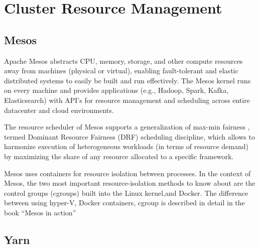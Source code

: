 \section{Cluster Resource Management}
\label{S:o-cluster}


\subsection{Mesos}

     Apache Mesos \cite{www-mesos} abstracts CPU, memory,
     storage, and other compute resources away from machines (physical
     or virtual), enabling fault-tolerant and elastic distributed
     systems to easily be built and run effectively. The Mesos kernel
     runs on every machine and provides applications (e.g., Hadoop,
     Spark, Kafka, Elasticsearch) with API’s for resource management
     and scheduling across entire datacenter and cloud environments.

     The resource scheduler of Mesos supports a generalization of
     max-min fairness \cite{paper-mesos-Abu-Dbai-2016}, termed Dominant
     Resource Fairness (DRF) \cite{paper-mesos-ghodsi2011dominant}
     scheduling discipline, which allows to harmonize execution of
     heterogeneous workloads (in terms of resource demand) by
     maximizing the share of any resource allocated to a specific
     framework.
     
     Mesos uses containers for resource isolation between
     processes. In the context of Mesos, the two most important
     resource-isolation methods to know about are the control groups
     (cgroups) built into the Linux kernel,and Docker. The difference
     between using hyper-V, Docker containers, cgroup is described in
     detail in the book ``Mesos in action'' \cite{book-mesos-Ignazio-2016}


\subsection{Yarn}


